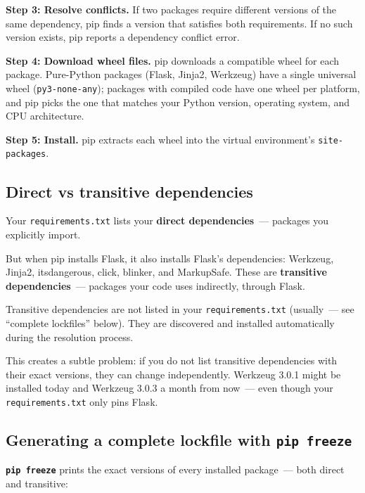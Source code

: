 \textbf{Step 3: Resolve conflicts.} If two packages require different versions of the same dependency, pip finds a version that satisfies both requirements. If no such version exists, pip reports a dependency conflict error.

\textbf{Step 4: Download wheel files.} pip downloads a compatible wheel for each package. Pure-Python packages (Flask, Jinja2, Werkzeug) have a single universal wheel (\texttt{py3-none-any}); packages with compiled code have one wheel per platform, and pip picks the one that matches your Python version, operating system, and CPU architecture.

\textbf{Step 5: Install.} pip extracts each wheel into the virtual environment's \texttt{site-packages}.

\subsection*{Direct vs transitive dependencies}\label{12-dependency-declaration:direct-vs-transitive-dependencies}

Your \texttt{requirements.txt} lists your \textbf{direct dependencies}~--- packages you explicitly import.

But when pip installs Flask, it also installs Flask's dependencies: Werkzeug, Jinja2, itsdangerous, click, blinker, and MarkupSafe. These are \textbf{transitive dependencies}~--- packages your code uses indirectly, through Flask.

Transitive dependencies are not listed in your \texttt{requirements.txt} (usually~--- see ``complete lockfiles'' below). They are discovered and installed automatically during the resolution process.

This creates a subtle problem: if you do not list transitive dependencies with their exact versions, they can change independently. Werkzeug 3.0.1 might be installed today and Werkzeug 3.0.3 a month from now~--- even though your \texttt{requirements.txt} only pins Flask.

\subsection*{\texorpdfstring{Generating a complete lockfile with \texttt{pip\ freeze}}{Generating a complete lockfile with pip freeze}}\label{12-dependency-declaration:generating-a-complete-lockfile-with-pip-freeze}

\textbf{\texttt{pip\ freeze}} prints the exact versions of every installed package~--- both direct and transitive:

